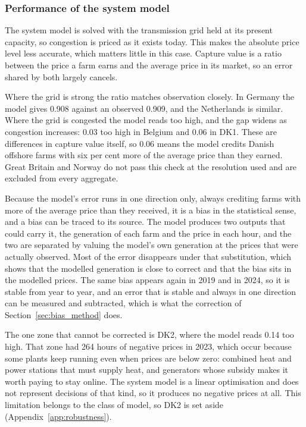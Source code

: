 \subsubsection{Performance of the system model}\label{sec:trust_system}

The system model is solved with the transmission grid held at its present
capacity, so congestion is priced as it exists today. This makes the absolute
price level less accurate, which matters little in this case. Capture value is a ratio
between the price a farm earns and the average price in its market, so an error
shared by both largely cancels.

Where the grid is strong the ratio matches observation closely. In Germany the
model gives 0.908 against an observed 0.909, and the Netherlands is similar.
Where the grid is congested the model reads too high, and the gap widens as
congestion increases: 0.03 too high in Belgium and 0.06 in DK1. These are
differences in capture value itself, so 0.06 means the model credits Danish
offshore farms with six per cent more of the average price than they earned.
Great Britain and Norway do not pass this check at the resolution used and
are excluded from every aggregate.

Because the model's error runs in one direction only, always crediting farms
with more of the average price than they received, it is a bias in the
statistical sense, and a bias can be traced to its source. The model produces
two outputs that could carry it, the generation of each farm and the price in
each hour, and the two are separated by valuing the model's own generation at
the prices that were actually observed. Most of the error disappears under
that substitution, which shows that the modelled generation is close to
correct and that the bias sits in the modelled prices. The same bias appears
again in 2019 and in 2024, so it is stable from year to year, and an error
that is stable and always in one direction can be measured and subtracted,
which is what the correction of Section~\ref{sec:bias_method} does.

The one zone that cannot be corrected is DK2, where the model reads 0.14 too
high. That zone
had 264 hours of negative prices in 2023, which occur because some plants keep
running even when prices are below zero: combined heat and power stations that
must supply heat, and generators whose subsidy makes it worth paying to stay
online. The system model is a linear optimisation and does not represent
decisions of that kind, so it produces no negative prices at all. This
limitation belongs to the class of model, so DK2 is set aside
(Appendix~\ref{app:robustness}).

